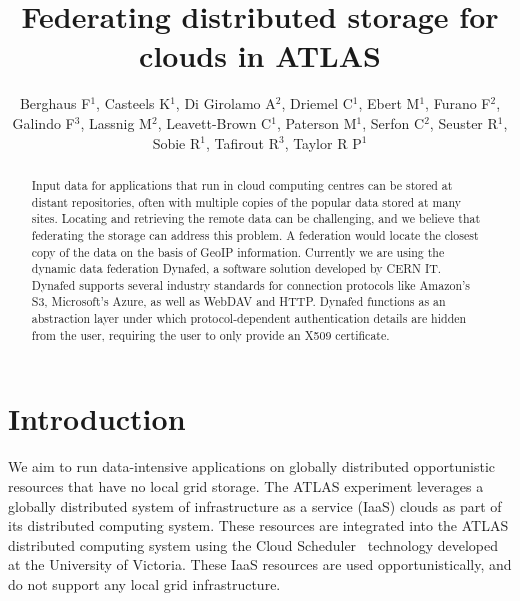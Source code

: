 \documentclass[a4paper]{jpconf}
\begin{document}
\title{Federating distributed storage for clouds in ATLAS}


\author{Berghaus F$^1$, Casteels K$^1$, Di Girolamo A$^2$, Driemel C$^1$, Ebert M$^1$, Furano F$^2$, Galindo F$^3$, Lassnig M$^2$, Leavett-Brown C$^1$, Paterson M$^1$, Serfon C$^2$, Seuster R$^1$, Sobie R$^1$, Tafirout R$^3$, Taylor R P$^1$}
\address{$^1$ Department of Physics and Astronomy, University of Victoria, Finnerty Road, Victoria V8P~5C2, Canada}
\address{$^2$ CERN, Geneva 1211, Switzerland}
\address{$^3$ TRIUMF, Wesbrook Mall, Vancouver V6T~2A3 Canada}


\begin{abstract}
Input data for applications that run in cloud computing centres can be stored at distant repositories, often with multiple copies of the popular data stored at many sites. Locating and retrieving the remote data can be challenging, and we believe that federating the storage can address this problem. A federation would locate the closest copy of the data on the basis of GeoIP information. Currently we are using the dynamic data federation Dynafed, a software solution developed by CERN IT. Dynafed supports several industry standards for connection protocols like Amazon's S3, Microsoft's Azure, as well as WebDAV and HTTP. Dynafed functions as an abstraction layer under which protocol-dependent authentication details are  hidden from the user, requiring the user to only provide an X509 certificate.
\end{abstract}

\section{Introduction}
We aim to run data-intensive applications on globally distributed opportunistic resources that have no local grid storage. The ATLAS experiment leverages a globally distributed system of infrastructure as a service (IaaS) clouds as part of its distributed computing system. These resources are integrated into the ATLAS distributed computing system using the Cloud Scheduler~\cite{cloud-scheduler} technology developed at the University of Victoria. These IaaS resources are used opportunistically, and do not support any local grid infrastructure.
\end{document}
